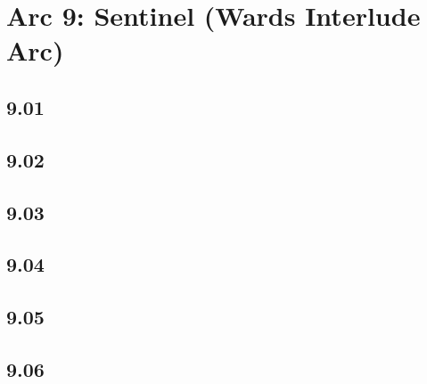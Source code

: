 \part*{Arc 9: Sentinel (Wards Interlude Arc)}
 \chapter*{9.01}
 \chapter*{9.02}
 \chapter*{9.03}
 \chapter*{9.04}
 \chapter*{9.05}
 \chapter*{9.06}







